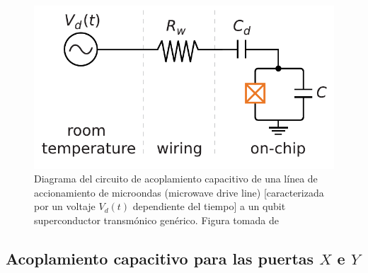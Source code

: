 \begin{figure}[h]
    \centering 
    \includegraphics[width=0.6\linewidth]{Figuras/Fig_scq_qubit_acoplado_a_fuente.png}
    \caption{Diagrama del circuito de acoplamiento capacitivo de una línea de accionamiento de microondas (microwave drive line) [caracterizada por un voltaje $V_d(t)$ dependiente del tiempo] a un qubit superconductor transmónico genérico. Figura tomada de \cite{bib_A_quantum_engineers_guide}}
    \label{Fig_scq_qubit_acoplado_a_fuente}
\end{figure}





    \subsection{Acoplamiento capacitivo para las puertas $X$ e $Y$} \label{ec_scq_puertas_XY}


    
